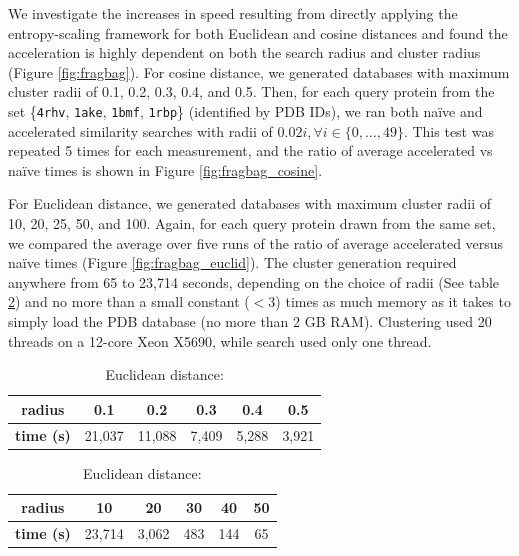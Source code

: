 \documentclass[11pt]{elsarticle}
\theoremstyle{definition}
\theoremstyle{remark}
\numberwithin{equation}{section}
\begin{document}
We investigate the increases in speed resulting from directly applying the entropy-scaling framework for both Euclidean and cosine distances and found the acceleration is highly dependent on both the search radius and cluster radius (Figure \ref{fig:fragbag}).
For cosine distance, we generated databases with maximum cluster radii of 0.1, 0.2, 0.3, 0.4, and 0.5.
Then, for each query protein from the set \{\texttt{4rhv}, \texttt{1ake}, \texttt{1bmf}, \texttt{1rbp}\} (identified by PDB IDs), we ran both na\"ive and accelerated similarity searches with radii of $0.02i, \forall i \in \{0,\ldots,49\}$.
This test was repeated 5 times for each measurement, and the ratio of average accelerated vs na\"ive times is shown in Figure \ref{fig:fragbag_cosine}.

For Euclidean distance, we generated databases with maximum cluster radii of 10, 20, 25, 50, and 100.
Again, for each query protein drawn from the same set, we compared the average over five runs of the ratio of average accelerated versus na\"ive times (Figure \ref{fig:fragbag_euclid}).
The cluster generation required anywhere from 65 to 23,714 seconds, depending on the choice of radii (See table \ref{tab:esfragbag_clustering}) and no more than a small constant ($<3$) times as much memory as it takes to simply load the PDB database (no more than 2 GB RAM).
Clustering used 20 threads on a 12-core Xeon X5690, while search used only one thread.
\begin{table}
\caption{Cluster generation time for esFragBag}
\label{tab:esfragbag_clustering}
\begin{subtable}{1\textwidth}
    \centering
\caption{Cosine distance:}
\begin{tabular}{c|ccccc}
\hline
\textbf{radius} & 0.1 & 0.2 & 0.3 & 0.4 &  0.5 \\
\hline
\textbf{time (s)} & 21,037 & 11,088 & 7,409 & 5,288 & 3,921 \\
\hline
\end{tabular}
\end{subtable}

\vspace{1em}
\begin{subtable}{1\textwidth}
    \centering
\caption{Euclidean distance:}
\begin{tabular}{c|ccccc}
\hline
\textbf{radius} & 10 & 20 & 30 & 40 & 50 \\
\hline
\textbf{time (s)} & 23,714 & 3,062 & 483 & 144 & 65 \\
\hline
\end{tabular}
\end{subtable}
\end{table}
\end{document}
